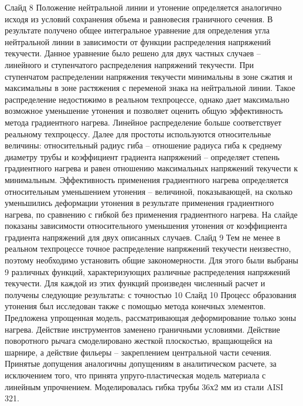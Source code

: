 Слайд 8
Положение нейтральной линии и утонение определяется аналогично исходя из условий сохранения объема и равновесия граничного сечения. В результате получено общее интегральное уравнение для определения угла нейтральной линии в зависимости от функции распределения напряжений текучести.
Данное уравнение было решено для двух частных случаев – линейного и ступенчатого распределения напряжений текучести. При ступенчатом распределении напряжения текучести минимальны в зоне сжатия и максимальны в зоне растяжения с переменой знака на нейтральной линии. Такое распределение недостижимо в реальном техпроцессе, однако дает максимально возможное уменьшение утонения и позволяет оценить общую эффективность метода градиентного нагрева. Линейное распределение больше соответствует реальному техпроцессу.
Далее для простоты используются относительные величины: относительный радиус гиба – отношение радиуса гиба к среднему диаметру трубы и коэффициент градиента напряжений – определяет степень градиентного нагрева и равен отношению максимальных напряжений текучести к минимальным. Эффективность применения градиентного нагрева определяется относительным уменьшением утонения – величиной, показывающей, на сколько уменьшились деформации утонения в результате применения градиентного нагрева, по сравнению с гибкой без применения градиентного нагрева. На слайде показаны зависимости относительного уменьшения утонения от коэффициента градиента напряжений для двух описанных случаев.
Слайд 9
Тем не менее в реальном техпроцессе точное распределение напряжений текучести неизвестно, поэтому необходимо установить общие закономерности. Для этого были выбраны 9 различных функций, характеризующих различные распределения напряжений текучести. Для каждой из этих функций произведен численный расчет и получены следующие результаты: с точностью 10%
Слайд 10
Процесс образования утонения был исследован также с помощью метода конечных элементов. Предложена упрощенная модель, рассматривающая деформирование только зоны нагрева. Действие инструментов заменено граничными условиями. Действие поворотного рычага смоделировано жесткой плоскостью, вращающейся на шарнире, а действие фильеры – закреплением центральной части сечения. 
Принятые допущения аналогичны допущениям в аналитическом расчете, за исключением того, что принята упруго-пластическая модель материала с линейным упрочнением. Моделировалась гибка трубы 36х2 мм из стали AISI 321.

